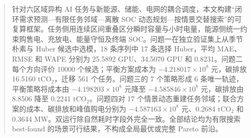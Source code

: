 \begin{abstract}
针对六区域异构 AI 任务与新能源、储能、电网的耦合调度，本文构建“闭环需求预测—有限任务邻域—离散 SOC 动态规划—按情景交替搜索”的可复算框架。任务侧用连续区间重叠区分瞬时容量与小时电量，能源侧统一约束购售电、充放电、能量守恒及终端 SOC。问题一在独立验证集上从季节朴素与 Huber 候选中选模，18 条序列中 17 条选择 Huber，平均 MAE、RMSE 和 WAPE 分别为 25.5892 GPU、34.5070 GPU 和 0.8231。问题二每个方向评价 10000 个候选；平衡方案成本为 $-4.218017\times10^8$ 元，碳排放 16.5160 tCO$_2$，迁移 561 个任务。问题三的 7 个策略形成 6 条唯一轨迹，平衡策略将成本由 $-4.198203\times10^8$ 元降至 $-4.585846\times10^8$ 元，碳排放由 8.8506 降至 0.2241 tCO$_2$。问题四对 17 个情景动态重建任务邻域；联合方案的成本、碳排放和峰值购电分别为 $-4.587163\times10^8$ 元、0.2684 tCO$_2$ 和 0.3644 MW。双运行除自然耗时字段外完全一致。全部结论均为有限搜索 best-found 的场景可行结果，不构成全局最优或完整 Pareto 前沿。
\end{abstract}
